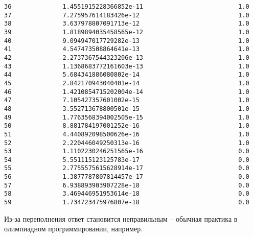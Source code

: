 \documentclass[11pt]{article}
\begin{document}
\begin{Verbatim}[commandchars=\\\{\}]
36              1.4551915228366852e-11                          1.0
37              7.275957614183426e-12                           1.0
38              3.637978807091713e-12                           1.0
39              1.8189894035458565e-12                          1.0
40              9.094947017729282e-13                           1.0
41              4.547473508864641e-13                           1.0
42              2.2737367544323206e-13                          1.0
43              1.1368683772161603e-13                          1.0
44              5.684341886080802e-14                           1.0
45              2.842170943040401e-14                           1.0
46              1.4210854715202004e-14                          1.0
47              7.105427357601002e-15                           1.0
48              3.552713678800501e-15                           1.0
49              1.7763568394002505e-15                          1.0
50              8.881784197001252e-16                           1.0
51              4.440892098500626e-16                           1.0
52              2.220446049250313e-16                           1.0
53              1.1102230246251565e-16                          0.0
54              5.551115123125783e-17                           0.0
55              2.7755575615628914e-17                          0.0
56              1.3877787807814457e-17                          0.0
57              6.938893903907228e-18                           0.0
58              3.469446951953614e-18                           0.0
59              1.734723475976807e-18                           0.0
    \end{Verbatim}

    Из-за переполнения ответ становится неправильным -- обычная практика в
олимпиадном программировании, например.
\end{document}
